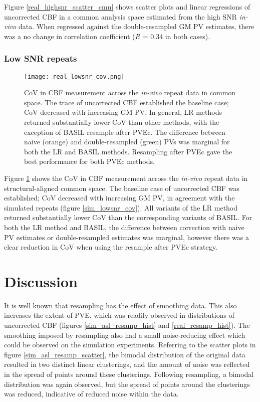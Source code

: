 Figure \ref{real_highsnr_scatter_cmn} shows scatter plots and linear regressions of uncorrected CBF in a common analysis space estimated from the high SNR \textit{in-vivo} data. When regressed against the double-resampled GM PV estimates, there was a no change in correlation coefficient ($R$ = 0.34 in both cases). 

%


\subsubsection{Low SNR repeats}


\begin{figure}[H]
\centering
\texttt{[image: real\_lowsnr\_cov.png]}
\caption{CoV in CBF measurement across the \textit{in-vivo} repeat data in common space. The trace of uncorrected CBF established the baseline case; CoV decreased with increasing GM PV. In general, LR methods returned substantially lower CoV than other methods, with the exception of BASIL resample after PVEc. The difference between naive (orange) and double-resampled (green) PVs was marginal for both the LR and BASIL methods. Resampling after PVEc gave the best performance for both PVEc methods.}
\label{real_lowsnr_cov}
\end{figure}

Figure \ref{real_lowsnr_cov} shows the CoV in CBF measurement across the \textit{in-vivo} repeat data in structural-aligned common space. The baseline case of uncorrected CBF was established; CoV decreased with increasing GM PV, in agreement with the simulated repeats (figure \ref{sim_lowsnr_cov}). All variants of the LR method returned substantially lower CoV than the corresponding variants of BASIL. For both the LR method and BASIL, the difference between correction with naive PV estimates or double-resampled estimates was marginal, however there was a clear reduction in CoV when using the resample after PVEc strategy. 

\section{Discussion}

It is well known that resampling has the effect of smoothing data. This also increases the extent of PVE, which was readily observed in distributions of uncorrected CBF (figures \ref{sim_asl_resamp_hist} and \ref{real_resamp_hist}). The smoothing imposed by resampling also had a small noise-reducing effect which could be observed on the simulation experiments. Referring to the scatter plots in figure \ref{sim_asl_resamp_scatter}, the bimodal distribution of the original data resulted in two distinct linear clusterings, and the amount of noise was reflected in the spread of points around these clusterings. Following resampling, a bimodal distribution was again observed, but the spread of points around the clusterings was reduced, indicative of reduced noise within the data. 

